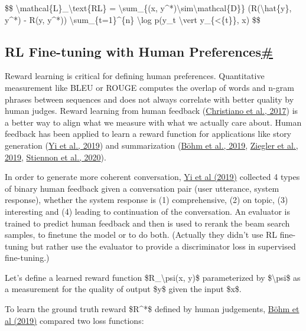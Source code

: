 \$\$ \textbackslash mathcal\{L\}\_\textbackslash text\{RL\} = \textbackslash sum\_\{(x, y\^{}*)\textbackslash sim\textbackslash mathcal\{D\}\} (R(\textbackslash hat\{y\}, y\^{}*) - R(y, y\^{}*)) \textbackslash sum\_\{t=1\}\^{}\{n\textquotesingle\} \textbackslash log p(y\_t \textbackslash vert y\_\{\textless\{t\}\}, x) \$\$

\subsection{\texorpdfstring{RL Fine-tuning with Human Preferences\hyperref[rl-fine-tuning-with-human-preferences]{\#}}{RL Fine-tuning with Human Preferences\#}}\label{rl-fine-tuning-with-human-preferences}

Reward learning is critical for defining human preferences. Quantitative measurement like BLEU or ROUGE computes the overlap of words and n-gram phrases between sequences and does not always correlate with better quality by human judges. Reward learning from human feedback (\href{https://arxiv.org/abs/1706.03741}{Christiano et al., 2017}) is a better way to align what we measure with what we actually care about. Human feedback has been applied to learn a reward function for applications like story generation (\href{https://arxiv.org/abs/1904.13015}{Yi et al., 2019}) and summarization (\href{https://arxiv.org/abs/1909.01214}{Böhm et al., 2019}, \href{https://arxiv.org/abs/1909.08593}{Ziegler et al., 2019}, \href{https://arxiv.org/abs/2009.01325}{Stiennon et al., 2020}).

In order to generate more coherent conversation, \href{https://arxiv.org/abs/1904.13015}{Yi et al (2019)} collected 4 types of binary human feedback given a conversation pair (user utterance, system response), whether the system response is (1) comprehensive, (2) on topic, (3) interesting and (4) leading to continuation of the conversation. An evaluator is trained to predict human feedback and then is used to rerank the beam search samples, to finetune the model or to do both. (Actually they didn't use RL fine-tuning but rather use the evaluator to provide a discriminator loss in supervised fine-tuning.)

Let's define a learned reward function \$R\_\textbackslash psi(x, y)\$ parameterized by \$\textbackslash psi\$ as a measurement for the quality of output \$y\$ given the input \$x\$.

To learn the ground truth reward \$R\^{}*\$ defined by human judgements, \href{https://arxiv.org/abs/1909.01214}{Böhm et al (2019)} compared two loss functions:

